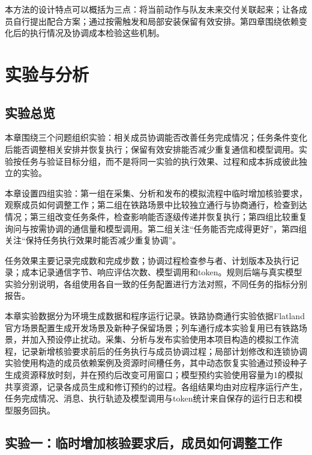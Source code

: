 本方法的设计特点可以概括为三点：将当前动作与队友未来交付关联起来；让各成员自行提出配合方案；通过按需触发和局部安装保留有效安排。第四章围绕依赖变化后的执行情况及协调成本检验这些机制。

\hypertarget{ux5b9eux9a8cux4e0eux5206ux6790}{%
\chapter{实验与分析}\label{ux5b9eux9a8cux4e0eux5206ux6790}}

\hypertarget{ux6574ux4f53ux4efbux52a1ux6548ux679cux7edfux4e00ux5de5ux5177ux4efbux52a1}{%
\section{实验总览}}

本章围绕三个问题组织实验：相关成员协调能否改善任务完成情况；任务条件变化后能否调整相关安排并恢复执行；保留有效安排能否减少重复通信和模型调用。实验按任务与验证目标分组，而不是将同一实验的执行效果、过程和成本拆成彼此独立的实验。

本章设置四组实验：第一组在采集、分析和发布的模拟流程中临时增加核验要求，观察成员如何调整工作；第二组在铁路场景中比较独立通行与协商通行，检查到达情况；第三组改变任务条件，检查影响能否逐级传递并恢复执行；第四组比较重复询问与按需协调的通信量和模型调用。第二组关注“任务能否完成得更好”，第四组关注“保持任务执行效果时能否减少重复协调”。

任务效果主要记录完成数和完成步数；协调过程检查参与者、计划版本及执行记录；成本记录通信字节、响应评估次数、模型调用和token。规则后端与真实模型实验分别说明，各组使用各自一致的任务配置进行方法对照，不同任务的指标分别报告。

本章实验数据分为环境生成数据和程序运行记录。铁路协商通行实验依据Flatland官方场景配置生成开发场景及新种子保留场景；列车通行成本实验复用已有铁路场景，并加入预设停止扰动。采集、分析与发布实验使用本项目构造的模拟工作流程，记录新增核验要求前后的任务执行与成员协调过程；局部计划修改和连锁协调实验使用构造的成员依赖案例及资源时间槽任务，其中动态恢复实验通过预设种子生成资源释放时刻，并在预约后改变可用窗口；模型预约实验使用容量为1的模拟共享资源，记录各成员生成和修订预约的过程。各组结果均由对应程序运行产生，任务完成情况、消息、执行轨迹及模型调用与token统计来自保存的运行日志和模型服务回执。

\section{实验一：临时增加核验要求后，成员如何调整工作}

